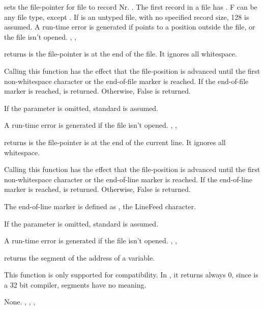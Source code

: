 \documentclass{report}
\begin{document}
{ sets the file-pointer for file  to record Nr. .
The first record in a file has . F can be any file type, except
. If  is an untyped file, with no specified record size, 128
is assumed.}
{A run-time error is generated if  points to a position outside
the file, or the file isn't opened.}
{, , }

\html{}

{ returns  is the file-pointer is at the end of the
file. It ignores all whitespace.

Calling this function has the effect that the file-position is advanced
until the first non-whitespace character or the end-of-file marker is
reached.
If the end-of-file marker is reached,  is returned. Otherwise,
False is returned.

If the parameter  is omitted, standard  is assumed.
}
{A run-time error is generated if the file  isn't opened.}
{, , }

\html{}

{ returns  is the file-pointer is at the end of the
current line. It ignores all whitespace.

Calling this function has the effect that the file-position is advanced
until the first non-whitespace character or the end-of-line marker is
reached.
If the end-of-line marker is reached,  is returned. Otherwise,
False is returned.

The end-of-line marker is defined as , the LineFeed character.

If the parameter  is omitted, standard  is assumed.}
{A run-time error is generated if the file  isn't opened.}
{, , }

\html{}

{ returns the segment of the address of a variable. 

This function is only supported for compatibility. In \fpc, it 
returns always 0, since \fpc is a 32 bit compiler, segments have no meaning.
}
{None.}
{, , , }
\end{document}
